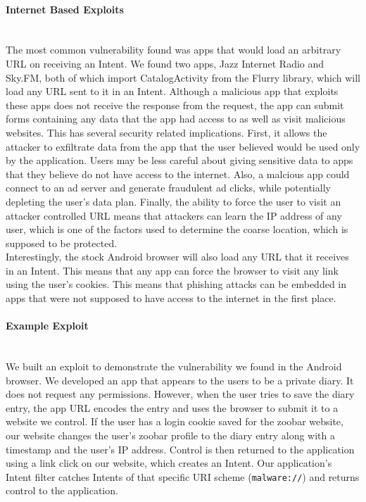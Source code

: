 \documentclass[12pt,a4paper]{article}
\begin{document}
\paragraph{Internet Based Exploits} ~\\ 

The most common vulnerability found was apps that would load an arbitrary URL on
receiving an Intent. We found two apps, Jazz Internet Radio and
Sky.FM, both of which import CatalogActivity from the Flurry library, which
will load any URL sent to it in an Intent. Although a malicious app that
exploits these apps does not receive the response from the request, the app can
submit forms containing any data that the app had access to as well as visit
malicious websites. This has several security related implications. First, it
allows the attacker to exfiltrate data from the app that the user believed would
be used only by the application. Users may be less careful about giving
sensitive data to apps that they believe do not have access to the internet.
Also, a malcious app could connect to an ad server and generate
fraudulent ad clicks, while potentially depleting the user's data plan.
Finally, the ability to force the user to visit an attacker controlled URL means
that attackers can learn the IP address of any user, which is one of the factors
used to determine the coarse location, which is supposed to be protected.  \\ 
Interestingly, the stock Android browser will also load any URL that it receives
in an Intent. This means that any app can force the browser to visit any link
using the user's cookies. This means that phishing attacks can be embedded in
apps that were not supposed to have access to the internet in the first place.

\paragraph{Example Exploit} ~\\

We built an exploit to demonstrate the vulnerability we found in the Android
browser. We developed an app that appears to the users to be a private diary. It
does not request any permissions. However, when the user tries to save the diary
entry, the app URL encodes the entry and uses the browser to submit it to a
website we control. If the user has a login cookie saved for the zoobar website,
our website changes the user's zoobar profile to the diary entry along with a
timestamp and the user's IP address. Control is then returned to the application
using a link click on our website, which creates an Intent. Our application's
Intent filter catches Intents of that specific URI scheme (\texttt{malware://})
and returns control to the application.
\end{document}
